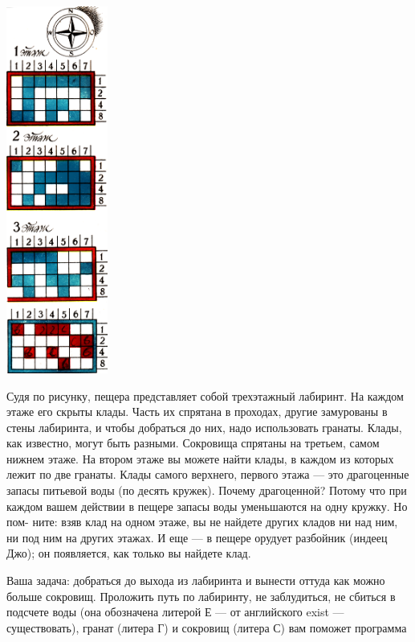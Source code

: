 \documentclass[11pt,a4paper,oneside]{article}
\begin{document}
\includegraphics[width=0.25\textwidth]{treasure2}

Судя по рисунку, пещера представляет собой трехэтажный лабиринт. На каждом этаже его скрыты клады. Часть их спрятана в проходах, другие замурованы в стены лабиринта, и чтобы добраться до них, надо использовать гранаты. Клады, как известно, могут быть разными. Сокровища спрятаны на третьем, самом нижнем этаже. На втором этаже вы можете найти клады, в каждом из которых лежит по две гранаты. Клады самого верхнего, первого этажа — это драгоценные запасы питьевой воды (по десять кружек). Почему драгоценной? Потому что при каждом вашем действии в пещере запасы воды уменьшаются на одну кружку. Но пом- ните: взяв клад на одном этаже, вы не найдете других кладов ни над ним, ни под ним на других этажах. И еще — в пещере орудует разбойник (индеец Джо); он появляется, как только вы найдете клад.

Ваша задача: добраться до выхода из лабиринта и вынести оттуда как можно больше сокровищ. Проложить путь по лабиринту, не заблудиться, не сбиться в подсчете воды (она обозначена литерой Е — от английского exist — существовать), гранат (литера Г) и сокровищ (литера С) вам поможет программа
\end{document}
